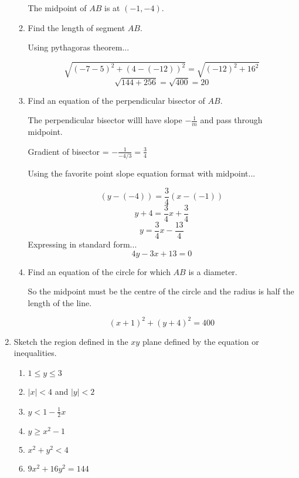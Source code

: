 \documentclass{article}
\begin{document}
\begin{enumerate}
\begin{enumerate}
			The midpoint of $AB$ is at $(-1, -4)$.

	\item Find the length of segment $AB$.

		Using pythagoras theorem...

		$$\sqrt{(-7 - 5)^2 + (4 - (-12))^2} = \sqrt{(-12)^2 + 16^2}$$
		$$\sqrt{144 + 256} = \sqrt{400} = 20$$

	\item Find an equation of the perpendicular bisector of $AB$.

		The perpendicular bisector willl have slope $-\frac{1}{m}$ and pass through midpoint.

		Gradient of bisector = $-\frac{1}{-4/3} = \frac{3}{4}$

		Using the favorite point slope equation format with midpoint...

		$$(y - (-4)) = \frac{3}{4}(x - (-1))$$
		$$y + 4 = \frac{3}{4}x + \frac{3}{4}$$
		$$y = \frac{3}{4}x - \frac{13}{4}$$
		Expressing in standard form...
		$$4y - 3x + 13 = 0$$

	\item Find an equation of the circle for which $AB$ is a diameter.

		So the midpoint must be the centre of the circle and the radius is half the length of the line.

		$$(x + 1)^2 + (y + 4)^2 = 400$$

	\end{enumerate}

	\item Sketch the region defined in the $xy$ plane defined by the equation or inequalities.

		\begin{enumerate}

			\item $1 \leq y \leq 3$

			\item $|x| < 4$ and $|y| < 2$

			\item $y < 1 - \frac{1}{2}x$

			\item $y \geq x^2 - 1$

			\item $x^2 + y^2 < 4$

			\item $9x^2 + 16y^2 = 144$

		\end{enumerate}

\end{enumerate}
\end{document}
